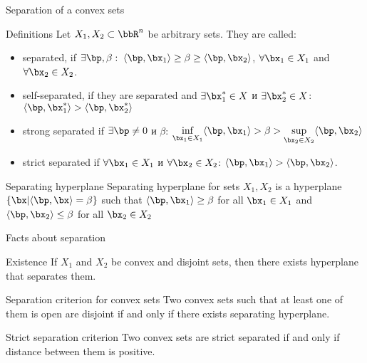 \documentclass[12pt]{beamer}
\begin{document}
\begin{frame}{Separation of a convex sets}
\small
\begin{block}{Definitions}
Let $X_1, X_2 \subset \bbR^n$ be arbitrary sets. 
They are called:
\vspace{-3mm}
\begin{itemize}
\item separated, if $\exists \bp, \beta: \; \langle\bp, \bx_1 \rangle \geq \beta \geq \langle \bp, \bx_2\rangle$, $\forall \bx_1 \in X_1$ and $\forall \bx_2 \in X_2$.
\vspace{-3mm}
\item self-separated, if they are separated and $\exists \bx_1^* \in X$ и $\exists \bx_2^* \in X$: $\langle \bp, \bx_1^* \rangle > \langle \bp, \bx_2^* \rangle$
\vspace{-3mm}
\item strong separated if $\exists \bp \neq 0$ и $\beta$: $\inf\limits_{\bx_1 \in X_1} \langle \bp, \bx_1 \rangle > \beta > \sup\limits_{\bx_2 \in X_2} \langle \bp, \bx_2 \rangle$
\vspace{-3mm}
\item strict separated if $\forall \bx_1 \in X_1$ и $\forall \bx_2 \in X_2$: $\langle \bp, \bx_1 \rangle > \langle \bp, \bx_2 \rangle$.
\end{itemize} 
\end{block}

\begin{block}{Separating hyperplane}
Separating hyperplane for sets $X_1, X_2$ is a hyperplane $\{ \bx | \langle \bp, \bx \rangle = \beta \}$ such that $\langle \bp, \bx_1 \rangle \geq \beta$ for all $\bx_1 \in X_1$ and $\langle \bp, \bx_2 \rangle \leq \beta$ for all $\bx_2 \in X_2$   
\end{block}
\end{frame}

\begin{frame}{Facts about separation}
\begin{block}{Existence}
If $X_1$ and $X_2$ be convex and disjoint sets, then there exists hyperplane that separates them. 
\end{block}

\begin{block}{Separation criterion for convex sets}
Two convex sets such that at least one of them is open are disjoint if and only if there exists separating hyperplane.
\end{block}

\begin{block}{Strict separation criterion}
Two convex sets are strict separated if and only if distance between them is positive.
\end{block}

\end{frame}
\end{document}
